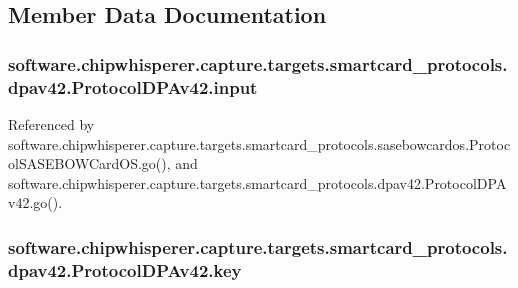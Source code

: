 \subsection{Member Data Documentation}
\hypertarget{classsoftware_1_1chipwhisperer_1_1capture_1_1targets_1_1smartcard__protocols_1_1dpav42_1_1ProtocolDPAv42_a2da3fcce3cf29c21a289749276b48542}{}
\subsubsection[{input}]{\setlength{\rightskip}{0pt plus 5cm}software.\+chipwhisperer.\+capture.\+targets.\+smartcard\+\_\+protocols.\+dpav42.\+Protocol\+D\+P\+Av42.\+input}\label{classsoftware_1_1chipwhisperer_1_1capture_1_1targets_1_1smartcard__protocols_1_1dpav42_1_1ProtocolDPAv42_a2da3fcce3cf29c21a289749276b48542}


Referenced by software.\+chipwhisperer.\+capture.\+targets.\+smartcard\+\_\+protocols.\+sasebowcardos.\+Protocol\+S\+A\+S\+E\+B\+O\+W\+Card\+O\+S.\+go(), and software.\+chipwhisperer.\+capture.\+targets.\+smartcard\+\_\+protocols.\+dpav42.\+Protocol\+D\+P\+Av42.\+go().

\hypertarget{classsoftware_1_1chipwhisperer_1_1capture_1_1targets_1_1smartcard__protocols_1_1dpav42_1_1ProtocolDPAv42_a72602a597c90a3b823a6520fc6756310}{}
\subsubsection[{key}]{\setlength{\rightskip}{0pt plus 5cm}software.\+chipwhisperer.\+capture.\+targets.\+smartcard\+\_\+protocols.\+dpav42.\+Protocol\+D\+P\+Av42.\+key}\label{classsoftware_1_1chipwhisperer_1_1capture_1_1targets_1_1smartcard__protocols_1_1dpav42_1_1ProtocolDPAv42_a72602a597c90a3b823a6520fc6756310}


